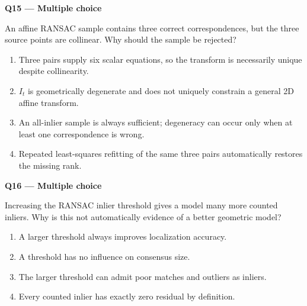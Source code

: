 \documentclass[11pt,a4paper]{article}
\begin{document}
\par\vspace{12pt}
\begin{minipage}{\linewidth}
\textbf{Q15 — Multiple choice}\par\smallskip
An affine RANSAC sample contains three correct correspondences,\allowbreak{} but the three source points are collinear. Why should the sample be rejected?
\begin{enumerate}[label=\textbf{\Alph*.}]
\item Three pairs supply six scalar equations,\allowbreak{} so the transform is necessarily unique despite collinearity.
\item \(I_t\) is geometrically degenerate and does not uniquely constrain a general 2D affine transform.
\item An all-inlier sample is always sufficient; degeneracy can occur only when at least one correspondence is wrong.
\item Repeated least-squares refitting of the same three pairs automatically restores the missing rank.
\end{enumerate}
\end{minipage}
\par\vspace{12pt}
\begin{minipage}{\linewidth}
\textbf{Q16 — Multiple choice}\par\smallskip
Increasing the RANSAC inlier threshold gives a model many more counted inliers. Why is this not automatically evidence of a better geometric model?
\begin{enumerate}[label=\textbf{\Alph*.}]
\item A larger threshold always improves localization accuracy.
\item A threshold has no influence on consensus size.
\item The larger threshold can admit poor matches and outliers as inliers.
\item Every counted inlier has exactly zero residual by definition.
\end{enumerate}
\end{minipage}
\par\vspace{12pt}
\end{document}
